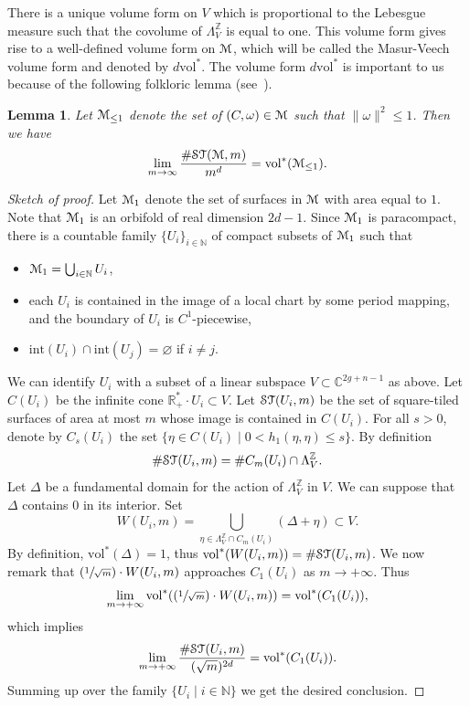 \documentclass[11pt]{article}
\numberwithin{equation}{section}
\let\mathcal\EuScript
\newcommand{\Psfrac}[2]{(\sfrac{#1}{#2})}
\theoremstyle{plain}
\newtheorem{Lemma}[Theorem]{Lemma}
\theoremstyle{definition}
\newcommand{\R}{\mathbb{R}}
\def\C{\mathbb{C}}
\newcommand\Z{\mathbb{Z}}
\newcommand{\N}{\mathbb{N}}
\newcommand{\Mcal}{\mathcal{M}}
\newcommand{\cM}{\mathcal{M}}
\newcommand{\ST}{\mathcal{ST}}
\newcommand{\inter}{\mathrm{int}}
\newcommand{\vol}{\mathrm{vol}}
\begin{document}
There is a unique volume form on $V$ which is proportional to the Lebesgue measure such that the covolume of $\Lambda^\Z_V$ is equal to one.
This volume form gives rise to a well-defined volume form on $\Mcal$, which will be called the Masur-Veech volume form and denoted by $d\vol^*$.
The volume form $d\vol^*$ is important to us because of the following folkloric lemma (see~\cite[Prop.\,1.6]{EO01}).

\begin{Lemma}\label{lm:MV:vol:count}
Let $\Mcal_{\leq 1}$ denote the set of $(C,\omega)\in \Mcal$ such that $\|\omega\|^2\leq 1$. Then we have
\[
\lim_{m\to \infty}\frac{\#\ST(\Mcal,m)}{m^d}=\vol^*(\Mcal_{\leq 1}).
\]
\end{Lemma}
\begin{proof}[Sketch of proof]
Let $\cM_1$ denote the set of surfaces in $\cM$ with area equal to $1$. Note that $\cM_1$ is an orbifold of real dimension $2d-1$.
Since $\cM_1$ is paracompact, there is a countable family $\{U_i\}_{i\in \N}$ of compact subsets of $\cM_1$ such that
\begin{itemize}
\item
$\cM_1=\bigcup_{i\in \N}U_i$,

\item
each $U_i$ is contained in the image of a local chart by some period mapping, and the boundary of $U_i$ is $C^1$-piecewise,

\item
$\inter(U_i)\cap\inter(U_j)=\varnothing$ if $i\neq j$.
\end{itemize}
We can identify $U_i$ with a subset of a linear subspace $V\subset \C^{2g+n-1}$ as above.
Let $C(U_i)$ be the infinite cone $\R^*_+\cdot U_i \subset V$.
Let $\ST(U_i,m)$ be the set of square-tiled surfaces of area at most $m$ whose image is contained in $C(U_i)$.
For all $s >0$, denote by $C_s(U_i)$ the set $\{\eta \in C(U_i)\mid 0< h_1(\eta,\eta) \leq s\}$.
By definition
\[
\#\ST(U_i,m)=\#C_m(U_i)\cap\Lambda^\Z_V.
\]
Let $\Delta$ be a fundamental domain for the action of $\Lambda^\Z_V$ in $V$.
We can suppose that $\Delta$ contains $0$ in its interior.
Set
\[
W(U_i,m)=\bigcup_{\eta\in\Lambda^{\Z}_V\cap C_{m}(U_i)}(\Delta+\eta) \subset V.
\]
By definition, $\vol^*(\Delta)=1$, thus $\vol^*(W(U_i,m))=\#\ST(U_i,m)$.
We now remark that $\Psfrac{1}{\sqrt{m}}\cdot W(U_i,m)$ approaches $C_1(U_i)$ as $m \to +\infty$. Thus
\[
\lim_{m \to +\infty}\vol^*(\Psfrac{1}{\sqrt{m}}\cdot W(U_i,m))= \vol^*(C_{1}(U_i)),
\]
which implies
\[
\lim_{m\to +\infty}\frac{\#\ST(U_i,m)}{(\sqrt{m})^{2d}}=\vol^*(C_1(U_i)).
\]
Summing up over the family $\{U_i\mid i \in \N\}$ we get the desired conclusion.
\end{proof}
\end{document}

